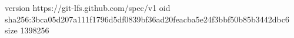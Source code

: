 version https://git-lfs.github.com/spec/v1
oid sha256:3bca05d207a111f1796d5df0839bf36ad20feacba5e24f3bbf50b85b3442dbc6
size 1398256
